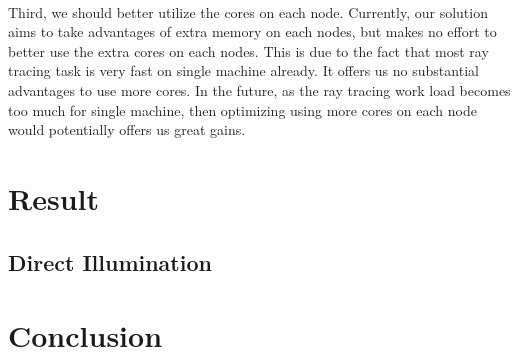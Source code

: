 \documentclass[a4paper, oneside, 10pt]{article}
\begin{document}
\paragraph{} Third, we should better utilize the cores on each node. Currently, our solution aims to take advantages of extra memory on each nodes, but makes no effort to better use the extra cores on each nodes. This is due to the fact that most ray tracing task is very fast on single machine already. It offers us no substantial advantages to use more cores.  In the future, as the ray tracing work load becomes too much for single machine, then optimizing using more cores on each node would potentially offers us great gains.

\section{Result}
\subsection{Direct Illumination}
\section{Conclusion}





\end{document}
